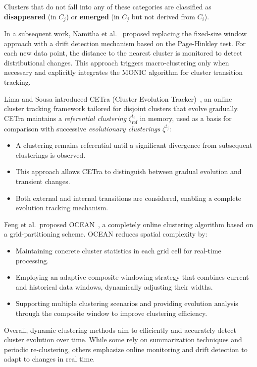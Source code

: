 Clusters that do not fall into any of these categories are classified as
\textbf{disappeared} (in $C_j$) or \textbf{emerged} (in $C_j$ but not derived
from $C_i$).

In a subsequent work, Namitha et al.~\cite{namitha_dynamic_clustering_2}
proposed replacing the fixed-size window approach with a drift detection
mechanism based on the Page-Hinkley test. For each new data point, the distance
to the nearest cluster is monitored to detect distributional changes. This
approach triggers macro-clustering only when necessary and explicitly
integrates the MONIC algorithm for cluster transition tracking.

Lima and Sousa introduced CETra (Cluster Evolution Tracker)~\cite{cetra}, an
online cluster tracking framework tailored for disjoint clusters that evolve
gradually. CETra maintains a \textit{referential clustering}
$\zeta_{\text{ref}}^{t_i}$ in memory, used as a basis for comparison with
successive \textit{evolutionary clusterings} $\zeta^{t_j}$:

\begin{itemize}
    \item A clustering remains referential until a significant divergence from subsequent
          clusterings is observed.
    \item This approach allows CETra to distinguish between gradual evolution and
          transient changes.
    \item Both external and internal transitions are considered, enabling a complete
          evolution tracking mechanism.
\end{itemize}

Feng et al.\ proposed OCEAN~\cite{ocean}, a completely online clustering
algorithm based on a grid-partitioning scheme. OCEAN reduces spatial complexity
by:

\begin{itemize}
    \item Maintaining concrete cluster statistics in each grid cell for real-time
          processing.
    \item Employing an adaptive composite windowing strategy that combines current and
          historical data windows, dynamically adjusting their widths.
    \item Supporting multiple clustering scenarios and providing evolution analysis
          through the composite window to improve clustering efficiency.
\end{itemize}

Overall, dynamic clustering methods aim to efficiently and accurately detect
cluster evolution over time. While some rely on summarization techniques and
periodic re-clustering, others emphasize online monitoring and drift detection
to adapt to changes in real time.